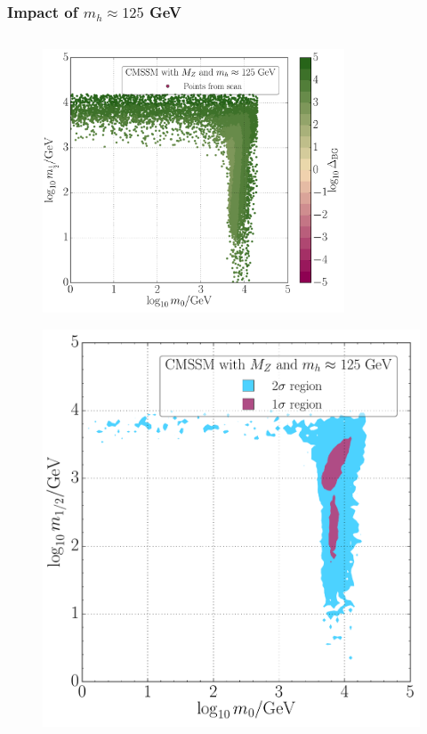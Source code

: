 \documentclass[10pt,aspectratio=169]{beamer}
\begin{document}
\begin{frame}
  \frametitle{Impact of $m_h \approx 125$ GeV}
  \begin{columns}[t]
    \begin{column}{0.7\textwidth}
      \begin{columns}[t]
        \begin{column}{0.5\textwidth}
          \vspace{-35pt}
          \begin{figure}
            \centering
            \includegraphics[width=0.8\textwidth]{CMSSM_BG_mh_m0m12}
          \end{figure}
          \vspace{-20pt}
          \begin{figure}
            \centering
            \includegraphics[height=0.7\textwidth]{CMSSM_pdf_mz_mh_m0m12}

\end{figure}
\end{column}
\end{columns}
\end{column}
\end{columns}
\end{frame}
\end{document}
